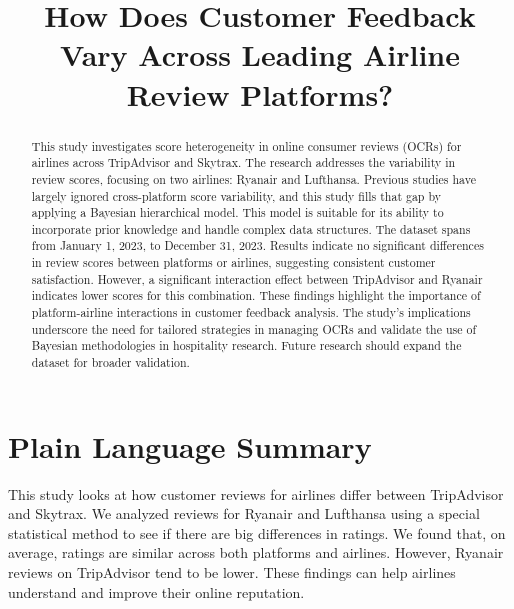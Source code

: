 \documentclass[
]{agujournal2019}
\begin{document}
\title{How Does Customer Feedback Vary Across Leading Airline Review
Platforms?}



\begin{abstract}
This study investigates score heterogeneity in online consumer reviews
(OCRs) for airlines across TripAdvisor and Skytrax. The research
addresses the variability in review scores, focusing on two airlines:
Ryanair and Lufthansa. Previous studies have largely ignored
cross-platform score variability, and this study fills that gap by
applying a Bayesian hierarchical model. This model is suitable for its
ability to incorporate prior knowledge and handle complex data
structures. The dataset spans from January 1, 2023, to December 31,
2023. Results indicate no significant differences in review scores
between platforms or airlines, suggesting consistent customer
satisfaction. However, a significant interaction effect between
TripAdvisor and Ryanair indicates lower scores for this combination.
These findings highlight the importance of platform-airline interactions
in customer feedback analysis. The study's implications underscore the
need for tailored strategies in managing OCRs and validate the use of
Bayesian methodologies in hospitality research. Future research should
expand the dataset for broader validation.
\end{abstract}

\section*{Plain Language Summary}
This study looks at how customer reviews for airlines differ between
TripAdvisor and Skytrax. We analyzed reviews for Ryanair and Lufthansa
using a special statistical method to see if there are big differences
in ratings. We found that, on average, ratings are similar across both
platforms and airlines. However, Ryanair reviews on TripAdvisor tend to
be lower. These findings can help airlines understand and improve their
online reputation.
\end{document}
